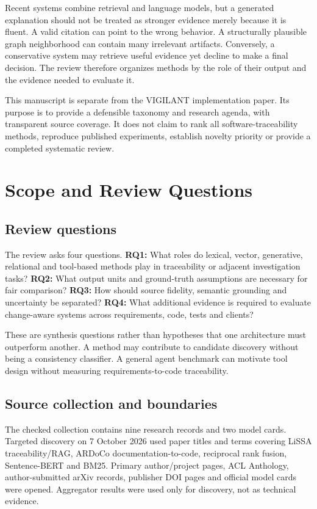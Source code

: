 \documentclass[conference,a4paper]{IEEEtran}
\begin{document}
Recent systems combine retrieval and language models, but a generated explanation should not be treated as stronger evidence merely because it is fluent. A valid citation can point to the wrong behavior. A structurally plausible graph neighborhood can contain many irrelevant artifacts. Conversely, a conservative system may retrieve useful evidence yet decline to make a final decision. The review therefore organizes methods by the role of their output and the evidence needed to evaluate it.

This manuscript is separate from the VIGILANT implementation paper. Its purpose is to provide a defensible taxonomy and research agenda, with transparent source coverage. It does not claim to rank all software-traceability methods, reproduce published experiments, establish novelty priority or provide a completed systematic review.

\section{Scope and Review Questions}
\subsection{Review questions}
The review asks four questions. \textbf{RQ1:} What roles do lexical, vector, generative, relational and tool-based methods play in traceability or adjacent investigation tasks? \textbf{RQ2:} What output units and ground-truth assumptions are necessary for fair comparison? \textbf{RQ3:} How should source fidelity, semantic grounding and uncertainty be separated? \textbf{RQ4:} What additional evidence is required to evaluate change-aware systems across requirements, code, tests and clients?

These are synthesis questions rather than hypotheses that one architecture must outperform another. A method may contribute to candidate discovery without being a consistency classifier. A general agent benchmark can motivate tool design without measuring requirements-to-code traceability.

\subsection{Source collection and boundaries}
The checked collection contains nine research records and two model cards. Targeted discovery on 7 October 2026 used paper titles and terms covering LiSSA traceability/RAG, ARDoCo documentation-to-code, reciprocal rank fusion, Sentence-BERT and BM25. Primary author/project pages, ACL Anthology, author-submitted arXiv records, publisher DOI pages and official model cards were opened. Aggregator results were used only for discovery, not as technical evidence.
\end{document}
